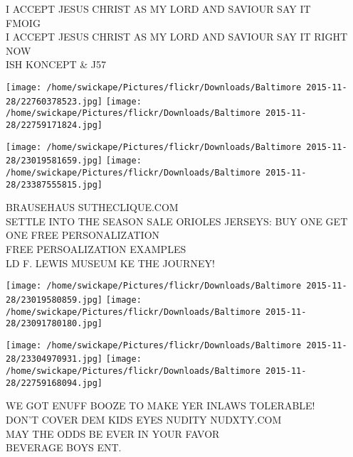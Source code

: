 \documentclass[10pt,letterpaper]{article}
\begin{document}
I ACCEPT JESUS CHRIST AS MY LORD AND SAVIOUR SAY IT\\
FMOIG\\
I ACCEPT JESUS CHRIST AS MY LORD AND SAVIOUR SAY IT RIGHT NOW\\
ISH KONCEPT \& J57
\pagebreak

\texttt{[image: /home/swickape/Pictures/flickr/Downloads/Baltimore 2015-11-28/22760378523.jpg]}
\texttt{[image: /home/swickape/Pictures/flickr/Downloads/Baltimore 2015-11-28/22759171824.jpg]}

\texttt{[image: /home/swickape/Pictures/flickr/Downloads/Baltimore 2015-11-28/23019581659.jpg]}
\texttt{[image: /home/swickape/Pictures/flickr/Downloads/Baltimore 2015-11-28/23387555815.jpg]}

BRAUSEHAUS SUTHECLIQUE.COM\\
SETTLE INTO THE SEASON SALE ORIOLES JERSEYS: BUY ONE GET ONE FREE PERSONALIZATION\\
FREE PERSOALIZATION EXAMPLES\\
LD F. LEWIS MUSEUM KE THE JOURNEY!
\pagebreak

\texttt{[image: /home/swickape/Pictures/flickr/Downloads/Baltimore 2015-11-28/23019580859.jpg]}
\texttt{[image: /home/swickape/Pictures/flickr/Downloads/Baltimore 2015-11-28/23091780180.jpg]}

\texttt{[image: /home/swickape/Pictures/flickr/Downloads/Baltimore 2015-11-28/23304970931.jpg]}
\texttt{[image: /home/swickape/Pictures/flickr/Downloads/Baltimore 2015-11-28/22759168094.jpg]}

WE GOT ENUFF BOOZE TO MAKE YER INLAWS TOLERABLE!\\
DON'T COVER DEM KIDS EYES NUDITY NUDXTY.COM\\
MAY THE ODDS BE EVER IN YOUR FAVOR\\
BEVERAGE BOYS ENT.
\pagebreak
\end{document}
